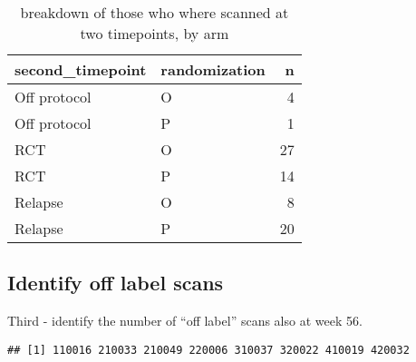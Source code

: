 \documentclass[]{article}
\newenvironment{Shaded}{\begin{snugshade}}{\end{snugshade}}
\newcommand{\KeywordTok}[1]{\textcolor[rgb]{0.13,0.29,0.53}{\textbf{#1}}}
\newcommand{\StringTok}[1]{\textcolor[rgb]{0.31,0.60,0.02}{#1}}
\newcommand{\CommentTok}[1]{\textcolor[rgb]{0.56,0.35,0.01}{\textit{#1}}}
\newcommand{\OperatorTok}[1]{\textcolor[rgb]{0.81,0.36,0.00}{\textbf{#1}}}
\newcommand{\NormalTok}[1]{#1}
\theoremstyle{definition}
\theoremstyle{definition}
\theoremstyle{definition}
\theoremstyle{remark}
\begin{document}
\begin{table}[t]

\caption{\label{tab:SecondScan-subcounts}breakdown of those who where scanned at two timepoints, by arm}
\centering
\begin{tabular}{l|l|r}
\hline
second\_timepoint & randomization & n\\
\hline
Off protocol & O & 4\\
\hline
Off protocol & P & 1\\
\hline
RCT & O & 27\\
\hline
RCT & P & 14\\
\hline
Relapse & O & 8\\
\hline
Relapse & P & 20\\
\hline
\end{tabular}
\end{table}

\subsection{Identify off label scans}\label{identify-off-label-scans}

Third - identify the number of ``off label'' scans also at week 56.

\begin{Shaded}
\end{Shaded}

\begin{verbatim}
## [1] 110016 210033 210049 220006 310037 320022 410019 420032
\end{verbatim}
\end{document}

